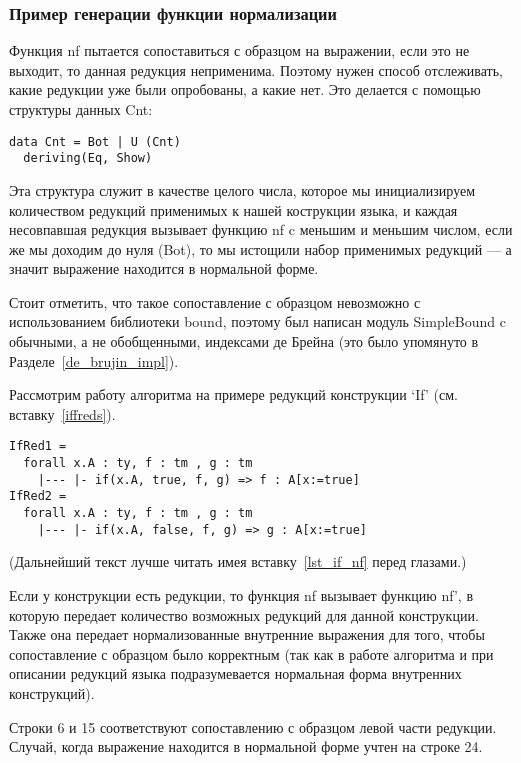 \pagebreak
\subsubsection{Пример генерации функции нормализации}

Функция nf пытается сопоставиться с образцом на выражении, если это не выходит, то данная редукция неприменима. Поэтому нужен способ отслеживать, какие редукции уже были опробованы, а какие нет. Это делается с помощью структуры данных Cnt:

\begin{lstlisting}
data Cnt = Bot | U (Cnt)
  deriving(Eq, Show)
\end{lstlisting}

Эта структура служит в качестве целого числа, которое мы инициализируем количеством редукций применимых к нашей кострукции языка, и каждая несовпавшая редукция вызывает функцию nf c меньшим и меньшим числом, если же мы доходим до нуля (Bot), то мы истощили набор применимых редукций --- а значит выражение находится в нормальной форме.

Стоит отметить, что такое сопоставление с образцом невозможно с использованием библиотеки bound\cite{bound}, поэтому был написан модуль SimpleBound c обычными, а не обобщенными, индексами де Брейна (это было упомянуто в Разделе~\ref{de_brujin_impl}).

Рассмотрим работу алгоритма на примере редукций конструкции `If' (см. вставку~\ref{iffreds}).

\begin{lstlisting}[label={iffreds}, caption={Правила редукций для конструкции If},captionpos=b, frame=single, float, floatplacement=H]
IfRed1 =
  forall x.A : ty, f : tm , g : tm
    |--- |- if(x.A, true, f, g) => f : A[x:=true]
IfRed2 =
  forall x.A : ty, f : tm , g : tm
    |--- |- if(x.A, false, f, g) => g : A[x:=true]
\end{lstlisting}

(Дальнейший текст лучше читать имея вставку~\ref{lst_if_nf} перед глазами.)

Если у конструкции есть редукции, то функция nf вызывает функцию nf', в которую передает количество возможных редукций для данной конструкции. Также она передает нормализованные внутренние выражения для того, чтобы сопоставление с образцом было корректным (так как в работе алгоритма и при описании редукций языка подразумевается нормальная форма внутренних конструкций).

Строки 6 и 15 соответствуют сопоставлению с образцом левой части редукции. Случай, когда выражение находится в нормальной форме учтен на строке 24.

